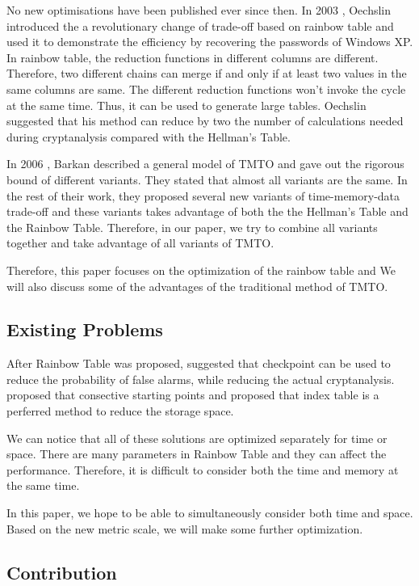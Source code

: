 \documentclass[runningheads,a4paper]{llncs}
\begin{document}
No new optimisations have been published ever since then. In 2003 \cite{oechslin2003making}, Oechslin introduced the a revolutionary change of trade-off based on rainbow table and used it to demonstrate the efficiency by  recovering the passwords of Windows XP. In rainbow table, the reduction functions in different columns are different. Therefore, two different chains can merge if and only if at least two values in the same columns are same. The different reduction functions won't invoke the cycle at the same time. Thus, it can be used to generate large tables. Oechslin suggested that his method can reduce by two the number of calculations needed during cryptanalysis compared with the Hellman's Table. 

In 2006 \cite{barkan2006rigorous}, Barkan described a general model of TMTO and gave out the rigorous bound of different variants. They stated that almost all variants are the same. In the rest of their work, they proposed several new variants of time-memory-data trade-off and these variants takes advantage of both the the Hellman's Table and the Rainbow Table. Therefore, in our paper, we try to combine all variants together and take advantage of all variants of TMTO.

Therefore, this paper focuses on the optimization of the rainbow table and We will also discuss some of the advantages of the traditional method of TMTO.

\subsection{Existing Problems}

After Rainbow Table was proposed, \cite{avoine2005time} suggested that checkpoint can be used to reduce the probability of false alarms, while reducing the actual cryptanalysis. \cite{standaert2003time} proposed that consective starting points and \cite{biryukov2001real} proposed that index table is a perferred method to reduce the storage space.

We can notice that all of these solutions are optimized separately for time or space. There are many parameters in Rainbow Table and they can affect the performance. Therefore, it is difficult to consider both the time and memory at the same time. 

In this paper, we hope to be able to simultaneously consider both time and space. Based on the new metric scale, we will make some further optimization.

\subsection{Contribution}
\end{document}

